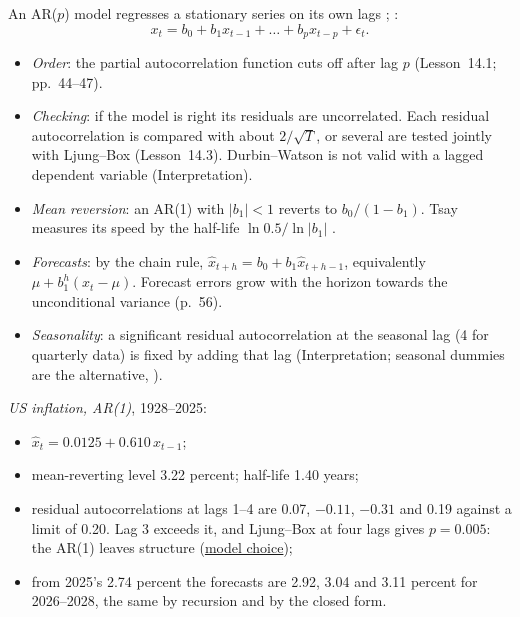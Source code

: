 \begin{qfmethod}\label{meth:autoregressive-forecasting}
 An AR($p$) model regresses a stationary series on its own lags \citep[Lesson~14.1]{regression-methods-course-notes}; \citep[pp.~37--40]{s7-tsay}:
\[ x_t=b_0+b_1x_{t-1}+\dots+b_px_{t-p}+\epsilon_t. \]
\begin{itemize}
\item \emph{Order}: the partial autocorrelation function cuts off after lag $p$ (Lesson~14.1; pp.~44--47).
\item \emph{Checking}: if the model is right its residuals are uncorrelated. Each residual autocorrelation is compared with about $2/\sqrt{T}$, or several are tested jointly with Ljung--Box (Lesson~14.3). Durbin--Watson is not valid with a lagged dependent variable (Interpretation).
\item \emph{Mean reversion}: an AR(1) with $|b_1|<1$ reverts to $b_0/(1-b_1)$. Tsay measures its speed by the half-life $\ln0.5/\ln|b_1|$ \citep[p.~56]{s7-tsay}.
\item \emph{Forecasts}: by the chain rule, $\hat x_{t+h}=b_0+b_1\hat x_{t+h-1}$, equivalently $\mu+b_1^h(x_t-\mu)$. Forecast errors grow with the horizon towards the unconditional variance (p.~56).
\item \emph{Seasonality}: a significant residual autocorrelation at the seasonal lag (4 for quarterly data) is fixed by adding that lag (Interpretation; seasonal dummies are the alternative, \citep[sec.~7.4]{s7-hyndman}).
\end{itemize}

 \emph{US inflation, AR(1)}, 1928--2025:
\begin{itemize}
\item $\hat x_t=0.0125+0.610\,x_{t-1}$;
\item mean-reverting level 3.22 percent; half-life 1.40 years;
\item residual autocorrelations at lags 1--4 are 0.07, $-0.11$, $-0.31$ and 0.19 against a limit of 0.20. Lag 3 exceeds it, and Ljung--Box at four lags gives $p=0.005$: the AR(1) leaves structure (\hyperref[meth:time-series-model-selection]{model choice});
\item from 2025's 2.74 percent the forecasts are 2.92, 3.04 and 3.11 percent for 2026--2028, the same by recursion and by the closed form.
\end{itemize}


\end{qfmethod}
